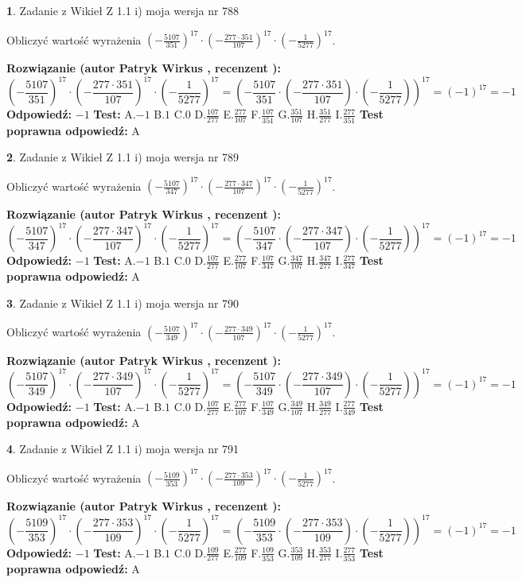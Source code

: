 \documentclass[12pt, a4paper]{article}
\theoremstyle{definition} %
\newtheorem{zad}{}
\newcommand{\zadStart}[1]{\begin{zad}#1\newline}
\newcommand{\zadStop}{\end{zad}}
\newcommand{\rozwStart}[2]{\noindent \textbf{Rozwiązanie (autor #1 , recenzent #2): }\newline}
\newcommand{\rozwStop}{\newline}
\newcommand{\odpStart}{\noindent \textbf{Odpowiedź:}\newline}
\newcommand{\odpStop}{\newline}
\newcommand{\testStart}{\noindent \textbf{Test:}\newline}
\newcommand{\testStop}{\newline}
\newcommand{\kluczStart}{\noindent \textbf{Test poprawna odpowiedź:}\newline}
\newcommand{\kluczStop}{\newline}
\begin{document}
\zadStart{Zadanie z Wikieł Z 1.1 i) moja wersja nr 788}

Obliczyć wartość wyrażenia $(-\frac{5107}{351})^{17} \cdot (-\frac{277 \cdot 351}{107})^{17} \cdot (-\frac{1}{5277})^{17}$.
\zadStop
\rozwStart{Patryk Wirkus}{}
$$(-\frac{5107}{351})^{17} \cdot (-\frac{277 \cdot 351}{107})^{17} \cdot (-\frac{1}{5277})^{17} = (-\frac{5107}{351} \cdot (-\frac{277 \cdot 351}{107}) \cdot (-\frac{1}{5277}))^{17} = (-1)^{17} = -1$$
\rozwStop
\odpStart
$-1$
\odpStop
\testStart
A.$-1$ B.$1$ C.$0$ D.$\frac{107}{277}$ E.$\frac{277}{107}$
F.$\frac{107}{351}$ G.$\frac{351}{107}$
H.$\frac{351}{277}$
I.$\frac{277}{351}$
\testStop
\kluczStart
A
\kluczStop



\zadStart{Zadanie z Wikieł Z 1.1 i) moja wersja nr 789}

Obliczyć wartość wyrażenia $(-\frac{5107}{347})^{17} \cdot (-\frac{277 \cdot 347}{107})^{17} \cdot (-\frac{1}{5277})^{17}$.
\zadStop
\rozwStart{Patryk Wirkus}{}
$$(-\frac{5107}{347})^{17} \cdot (-\frac{277 \cdot 347}{107})^{17} \cdot (-\frac{1}{5277})^{17} = (-\frac{5107}{347} \cdot (-\frac{277 \cdot 347}{107}) \cdot (-\frac{1}{5277}))^{17} = (-1)^{17} = -1$$
\rozwStop
\odpStart
$-1$
\odpStop
\testStart
A.$-1$ B.$1$ C.$0$ D.$\frac{107}{277}$ E.$\frac{277}{107}$
F.$\frac{107}{347}$ G.$\frac{347}{107}$
H.$\frac{347}{277}$
I.$\frac{277}{347}$
\testStop
\kluczStart
A
\kluczStop



\zadStart{Zadanie z Wikieł Z 1.1 i) moja wersja nr 790}

Obliczyć wartość wyrażenia $(-\frac{5107}{349})^{17} \cdot (-\frac{277 \cdot 349}{107})^{17} \cdot (-\frac{1}{5277})^{17}$.
\zadStop
\rozwStart{Patryk Wirkus}{}
$$(-\frac{5107}{349})^{17} \cdot (-\frac{277 \cdot 349}{107})^{17} \cdot (-\frac{1}{5277})^{17} = (-\frac{5107}{349} \cdot (-\frac{277 \cdot 349}{107}) \cdot (-\frac{1}{5277}))^{17} = (-1)^{17} = -1$$
\rozwStop
\odpStart
$-1$
\odpStop
\testStart
A.$-1$ B.$1$ C.$0$ D.$\frac{107}{277}$ E.$\frac{277}{107}$
F.$\frac{107}{349}$ G.$\frac{349}{107}$
H.$\frac{349}{277}$
I.$\frac{277}{349}$
\testStop
\kluczStart
A
\kluczStop



\zadStart{Zadanie z Wikieł Z 1.1 i) moja wersja nr 791}

Obliczyć wartość wyrażenia $(-\frac{5109}{353})^{17} \cdot (-\frac{277 \cdot 353}{109})^{17} \cdot (-\frac{1}{5277})^{17}$.
\zadStop
\rozwStart{Patryk Wirkus}{}
$$(-\frac{5109}{353})^{17} \cdot (-\frac{277 \cdot 353}{109})^{17} \cdot (-\frac{1}{5277})^{17} = (-\frac{5109}{353} \cdot (-\frac{277 \cdot 353}{109}) \cdot (-\frac{1}{5277}))^{17} = (-1)^{17} = -1$$
\rozwStop
\odpStart
$-1$
\odpStop
\testStart
A.$-1$ B.$1$ C.$0$ D.$\frac{109}{277}$ E.$\frac{277}{109}$
F.$\frac{109}{353}$ G.$\frac{353}{109}$
H.$\frac{353}{277}$
I.$\frac{277}{353}$
\testStop
\kluczStart
A
\kluczStop
\end{document}

